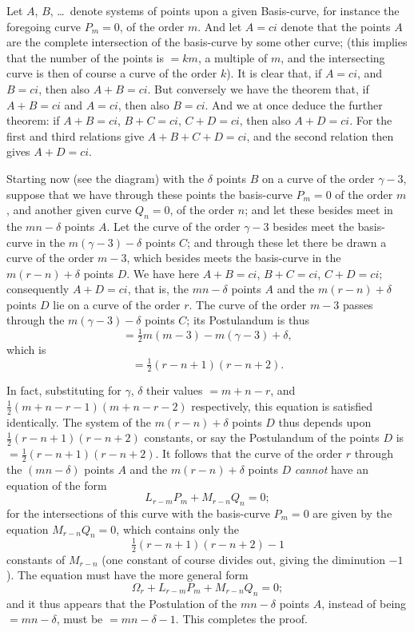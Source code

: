 \documentclass[12pt,a4paper]{article}
\theoremstyle{definition}
\begin{document}
Let $A$, $B$, \ldots\ denote systems of points upon a given Basis-curve, for instance
the foregoing curve $P_m = 0$, of the order $m$. And let $A = ci$ denote that the points
$A$ are the complete intersection of the basis-curve by some other curve; (this implies
that the number of the points is $= km$, a multiple of $m$, and the intersecting curve is
then of course a curve of the order $k$). It is clear that, if $A = ci$, and $B = ci$, then
also $A + B = ci$. But conversely we have the theorem that, if $A + B = ci$ and $A = ci$,
then also $B = ci$. And we at once deduce the further theorem: if $A + B = ci$, $B + C = ci$,
$C + D = ci$, then also $A + D = ci$. For the first and third relations give $A + B + C + D = ci$,
and the second relation then gives $A + D = ci$.

Starting now (see the diagram) with the $\delta$ points $B$ on a curve of the order
$\gamma - 3$, suppose that we have through these points the basis-curve $P_m = 0$ of the order
$m$, and another given curve $Q_n = 0$, of the order $n$; and let these besides meet in
the $mn - \delta$ points $A$. Let the curve of the order $\gamma - 3$ besides meet the basis-curve
in the $m(\gamma-3) - \delta$ points $C$; and through these let there be drawn a curve of the
order $m - 3$, which besides meets the basis-curve in the $m(r-n) + \delta$ points $D$. We
have here $A + B = ci$, $B + C = ci$, $C + D = ci$; consequently $A + D = ci$, that is, the
$mn - \delta$ points $A$ and the $m(r-n) + \delta$ points $D$ lie on a curve of the order $r$. The
curve of the order $m - 3$ passes through the $m(\gamma-3) - \delta$ points $C$; its Postulandum is thus
\[
= \tfrac12 m(m-3) - m(\gamma-3) + \delta,
\]
which is
\[
= \tfrac12(r-n+1)(r-n+2).
\]

In fact, substituting for $\gamma$, $\delta$ their values $= m + n - r$, and
$\tfrac12(m+n-r-1)(m+n-r-2)$
respectively, this equation is satisfied identically. The system of the $m(r-n) + \delta$ points
$D$ thus depends upon $\tfrac12(r-n+1)(r-n+2)$ constants, or say the Postulandum of
the points $D$ is $= \tfrac12(r-n+1)(r-n+2)$. It follows that the curve of the order $r$
through the $(mn - \delta)$ points $A$ and the $m(r-n) + \delta$ points $D$ \textit{cannot} have an equation
of the form
\[
L_{r-m} P_m + M_{r-n} Q_n = 0;
\]
for the intersections of this curve with the basis-curve $P_m = 0$ are given by the
equation $M_{r-n} Q_n = 0$, which contains only the
\[
\tfrac12(r-n+1)(r-n+2) - 1
\]
constants of $M_{r-n}$ (one constant of course divides out, giving the diminution $-1$).
The equation must have the more general form
\[
\Omega_r + L_{r-m} P_m + M_{r-n} Q_n = 0;
\]
and it thus appears that the Postulation of the $mn - \delta$ points $A$, instead of being
$= mn - \delta$, must be $= mn - \delta - 1$. This completes the proof.
\end{document}
